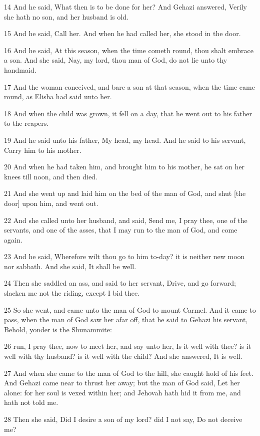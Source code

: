 \par 14 And he said, What then is to be done for her? And Gehazi answered, Verily she hath no son, and her husband is old.
\par 15 And he said, Call her. And when he had called her, she stood in the door.
\par 16 And he said, At this season, when the time cometh round, thou shalt embrace a son. And she said, Nay, my lord, thou man of God, do not lie unto thy handmaid.
\par 17 And the woman conceived, and bare a son at that season, when the time came round, as Elisha had said unto her.
\par 18 And when the child was grown, it fell on a day, that he went out to his father to the reapers.
\par 19 And he said unto his father, My head, my head. And he said to his servant, Carry him to his mother.
\par 20 And when he had taken him, and brought him to his mother, he sat on her knees till noon, and then died.
\par 21 And she went up and laid him on the bed of the man of God, and shut [the door] upon him, and went out.
\par 22 And she called unto her husband, and said, Send me, I pray thee, one of the servants, and one of the asses, that I may run to the man of God, and come again.
\par 23 And he said, Wherefore wilt thou go to him to-day? it is neither new moon nor sabbath. And she said, It shall be well.
\par 24 Then she saddled an ass, and said to her servant, Drive, and go forward; slacken me not the riding, except I bid thee.
\par 25 So she went, and came unto the man of God to mount Carmel. And it came to pass, when the man of God saw her afar off, that he said to Gehazi his servant, Behold, yonder is the Shunammite:
\par 26 run, I pray thee, now to meet her, and say unto her, Is it well with thee? is it well with thy husband? is it well with the child? And she answered, It is well.
\par 27 And when she came to the man of God to the hill, she caught hold of his feet. And Gehazi came near to thrust her away; but the man of God said, Let her alone: for her soul is vexed within her; and Jehovah hath hid it from me, and hath not told me.
\par 28 Then she said, Did I desire a son of my lord? did I not say, Do not deceive me?
